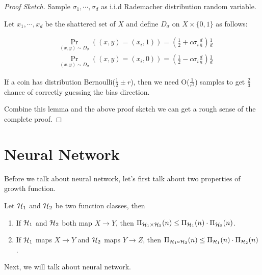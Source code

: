 \documentclass[../main.tex]{subfiles}
\begin{document}
		 \begin{proof}[Proof Sketch]
			Sample $\sigma_1, \cdots , \sigma_d$ as i.i.d Rademacher distribution random variable.
		 		
		 		Let $x_1, \cdots, x_d$ be the shattered set of $X$ and define $D_\sigma$ on $X \times \{0,1\}$ as follows:
		 		
 		\begin{equation}
 		\begin{aligned}
 	&\Pr\limits_{(x,y) \sim D_\sigma} ((x,y) = (x_i, 1)) = (\frac{1}{2} + c\sigma_i \frac{d}{n}) \frac{1}{d} \\
 	&\Pr\limits_{(x,y) \sim D_\sigma} ((x,y) = (x_i, 0)) = (\frac{1}{2} - c\sigma_i \frac{d}{n}) \frac{1}{d} 
 		\end{aligned}
 		\end{equation} 
 		
 		\begin{lemma}
 				If a coin has distribution Bernoulli($\frac{1}{2} \pm r $), then we need O($\frac{1}{r^2}$) samples to get $\frac{2}{3}$ chance of correctly guessing the bias direction.
 			\end{lemma}
 		
 			Combine this lemma and the above proof sketch we can get a rough sense of the complete proof.
		 \end{proof}
		 
		 
		 \section{Neural Network}
		 
		 Before we talk about neural network, let's first talk about two properties of growth function.
		 
		 \begin{fact}\label{Growthfunctionfact}
		 	Let $\mathcal{H}_1$ and $\mathcal{H}_2$ be two function classes, then
		 	
		 	\begin{enumerate}
		 		\item If $\mathcal{H}_1$ and $\mathcal{H}_2$ both map $X\to Y$, then $\Pi_{\mathcal{H}_1 \times \mathcal{H}_2}(n) \leq \Pi_{\mathcal{H}_1}(n) \cdot \Pi_{\mathcal{H}_2}(n) $.
		 		\item If $\mathcal{H}_1$ maps $X\to Y$ and $\mathcal{H}_2$ maps $Y\to Z$, then  $\Pi_{\mathcal{H}_1 \circ \mathcal{H}_2}(n) \leq \Pi_{\mathcal{H}_1}(n) \cdot \Pi_{\mathcal{H}_2}(n) $.
		 	\end{enumerate}
		 \end{fact}
	 
	 Next, we will talk about neural network.
	 
\end{document}
